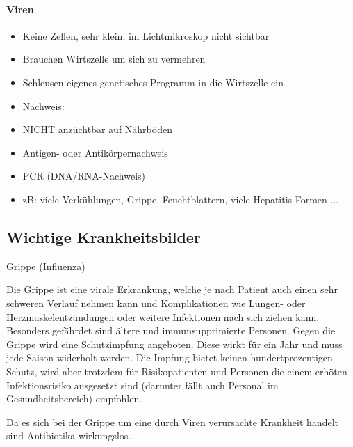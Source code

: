 \documentclass{article}
\begin{document}
\paragraph[Viren]{Viren}
\begin{itemize}
\item Keine Zellen, sehr klein, im Lichtmikroskop nicht sichtbar

\item Brauchen Wirtszelle um sich zu vermehren

\item Schleusen eigenes genetisches Programm in die Wirtszelle ein

\item Nachweis:

\end{itemize}
\begin{itemize}
\item NICHT anz\"uchtbar auf N\"ahrb\"oden

\item Antigen- oder Antik\"orpernachweis

\item PCR (DNA/RNA-Nachweis)

\end{itemize}
\begin{itemize}
\item zB: viele Verk\"uhlungen, Grippe, Feuchtblattern, viele
Hepatitis-Formen ...

\end{itemize}
\subsection{Wichtige Krankheitsbilder}
Grippe (Influenza)

Die Grippe ist eine virale Erkrankung, welche je nach Patient auch einen
sehr schweren Verlauf nehmen kann und Komplikationen wie Lungen- oder 
Herzmuskelentz\"undungen oder weitere Infektionen nach sich ziehen
kann. Besonders gef\"ahrdet sind \"altere und immunsupprimierte
Personen. Gegen die Grippe wird eine Schutzimpfung angeboten. Diese
wirkt f\"ur ein Jahr und muss jede Saison widerholt werden. Die Impfung
bietet keinen hundertprozentigen Schutz, wird aber trotzdem f\"ur
Risikopatienten und Personen die einem erh\"oten Infektionsrisiko
ausgesetzt sind (darunter f\"allt auch Personal im Gesundheitsbereich)
empfohlen. 

Da es sich bei der Grippe um eine durch Viren verursachte Krankheit
handelt sind Antibiotika wirkungslos.
\end{document}
